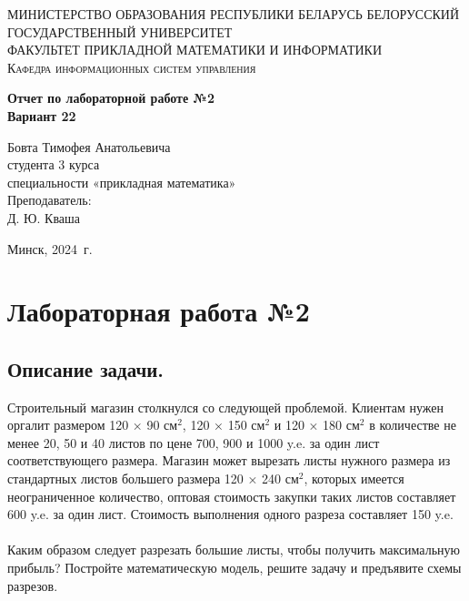 \documentclass[a4paper, 12pt]{report}
\begin{document}
	\begin{titlepage}
		\begin{center}
			\textsc{МИНИСТЕРСТВО ОБРАЗОВАНИЯ РЕСПУБЛИКИ БЕЛАРУСЬ БЕЛОРУССКИЙ ГОСУДАРСТВЕННЫЙ УНИВЕРСИТЕТ
				\\[5mm]
				ФАКУЛЬТЕТ ПРИКЛАДНОЙ МАТЕМАТИКИ И ИНФОРМАТИКИ\\[2mm]
				Кафедра информационных систем управления
			}
			
			\vfill
			
			\textbf{Отчет по лабораторной работе №2\\
				Вариант 22
				\\[26mm]
			}
		\end{center}
		
		\hfill
		\begin{minipage}{.5\textwidth}
			\begin{flushright}
				Бовта Тимофея Анатольевича\\
				студента 3 курса\\
				специальности «прикладная математика»\\[5mm]
				
				Преподаватель:\\[2mm] 
				Д. Ю. Кваша\\
			\end{flushright}
		\end{minipage}%
		\vfill
		\begin{center}
			Минск, 2024\ г.
		\end{center}
	\end{titlepage}
	\newpage
	\section*{Лабораторная работа №2}
	\subsection*{Описание задачи.}
	Строительный магазин столкнулся со следующей проблемой. Клиентам нужен оргалит размером 120 × 90 см$^2$, 120 × 150 см$^2$ и 120 × 180 см$^2$ в количестве не менее 20, 50 и 40 листов по цене 700, 900 и 1000 y.e. за один лист соответствующего размера. Магазин может вырезать листы нужного размера из стандартных листов большего размера 120 × 240 см$^2$, которых имеется неограниченное количество, оптовая стоимость закупки таких листов составляет 600 y.e. за один лист. Стоимость выполнения одного разреза составляет 150 y.e.\\\\
	Каким образом следует разрезать большие листы, чтобы получить максимальную прибыль? Постройте математическую модель, решите задачу и предъявите схемы разрезов.
\end{document}
